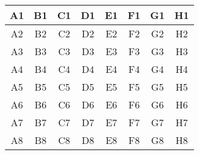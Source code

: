 \documentclass{article}
\begin{document}
\begin{tabular}{  |c|c|c|c|c|c|c|c| }
\hline
A1 & B1 & C1 & D1 & E1 & F1 & G1 & H1 \\
\hline
A2 & B2 & C2 & D2 & E2 & F2 & G2 & H2 \\ 
\hline
A3 & B3 & C3 & D3 & E3 & F3 & G3 & H3 \\
\hline
A4 & B4 & C4 & D4 & E4 & F4 & G4 & H4 \\
\hline
A5 & B5 & C5 & D5 & E5 & F5 & G5 & H5 \\
\hline
A6 & B6 & C6 & D6 & E6 & F6 & G6 & H6 \\
\hline
A7 & B7 & C7 & D7 & E7 & F7 & G7 & H7 \\
\hline
A8 & B8 & C8 & D8 & E8 & F8 & G8 & H8 \\
\hline
\end{tabular}
\end{document}
